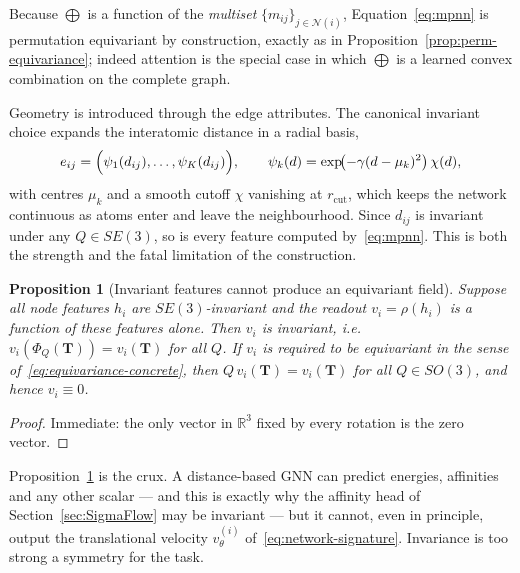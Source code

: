 \documentclass[a4paper,12pt]{article}
\newtheorem{proposition}[theorem]{Proposition}
\theoremstyle{remark}
\begin{document}
Because $\bigoplus$ is a function of the \emph{multiset} $\{m_{ij}\}_{j\in\mathcal N(i)}$,
Equation~\eqref{eq:mpnn} is permutation equivariant by construction, exactly as in
Proposition~\ref{prop:perm-equivariance}; indeed attention is the special case in which
$\bigoplus$ is a learned convex combination on the complete graph.

Geometry is introduced through the edge attributes. The canonical invariant choice
expands the interatomic distance in a radial basis,
\begin{equation}
\label{eq:rbf}
e_{ij}
=
\Bigl(\psi_1(d_{ij}),\dots,\psi_K(d_{ij})\Bigr),
\qquad
\psi_k(d)=\exp\!\bigl(-\gamma(d-\mu_k)^2\bigr)\,\chi(d),
\end{equation}
with centres $\mu_k$ and a smooth cutoff $\chi$ vanishing at $r_{\mathrm{cut}}$, which
keeps the network continuous as atoms enter and leave the neighbourhood. Since
$d_{ij}$ is invariant under any $Q\in SE(3)$, so is every feature computed
by~\eqref{eq:mpnn}. This is both the strength and the fatal limitation of the
construction.

\begin{proposition}[Invariant features cannot produce an equivariant field]
\label{prop:invariance-obstruction}
Suppose all node features $h_i$ are $SE(3)$-invariant and the readout
$v_i=\rho(h_i)$ is a function of these features alone. Then $v_i$ is invariant, i.e.\
$v_i(\Phi_Q(\mathbf T))=v_i(\mathbf T)$ for all $Q$. If $v_i$ is required to be
equivariant in the sense of~\eqref{eq:equivariance-concrete}, then
$Q\,v_i(\mathbf T)=v_i(\mathbf T)$ for all $Q\in SO(3)$, and hence $v_i\equiv0$.
\end{proposition}

\begin{proof}
Immediate: the only vector in $\mathbb R^3$ fixed by every rotation is the zero vector.
\end{proof}

Proposition~\ref{prop:invariance-obstruction} is the crux. A distance-based GNN can
predict energies, affinities and any other scalar --- and this is exactly why the
affinity head of Section~\ref{sec:SigmaFlow} may be invariant --- but it cannot, even
in principle, output the translational velocity $v^{(i)}_\theta$
of~\eqref{eq:network-signature}. Invariance is too strong a symmetry for the task.
\end{document}
